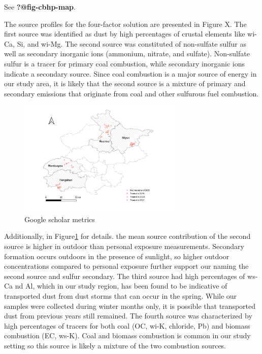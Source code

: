 \documentclass[
  letterpaper,
  DIV=11,
  numbers=noendperiod]{scrartcl}
\begin{document}
See \textbf{?@fig-cbhp-map}.

\newpage

The source profiles for the four-factor solution are presented in Figure
X. The first source was identified as dust by high percentages of
crustal elements like wi-Ca, Si, and wi-Mg. The second source was
constituted of non-sulfate sulfur as well as secondary inorganic ions
(ammonium, nitrate, and sulfate). Non-sulfate sulfur is a tracer for
primary coal combustion, while secondary inorganic ions indicate a
secondary source. Since coal combustion is a major source of energy in
our study area, it is likely that the second source is a mixture of
primary and secondary emissions that originate from coal and other
sulfurous fuel combustion.

\begin{figure}
\includegraphics[width=0.7\textwidth]{images/policy-implementation-map.png}
\caption{\label{fig-map}{Google scholar metrics}}
\end{figure}

Additionally, in Figure\ref{fig-map} for details. the mean source
contribution of the second source is higher in outdoor than personal
exposure measurements. Secondary formation occurs outdoors in the
presence of sunlight, so higher outdoor concentrations compared to
personal exposure further support our naming the second source and
sulfur secondary. The third source had high percentages of ws-Ca nd Al,
which in our study region, has been found to be indicative of
transported dust from dust storms that can occur in the spring. While
our samples were collected during winter months only, it is possible
that transported dust from previous years still remained. The fourth
source was characterized by high percentages of tracers for both coal
(OC, wi-K, chloride, Pb) and biomass combustion (EC, ws-K). Coal and
biomass combustion is common in our study setting so this source is
likely a mixture of the two combustion sources.
\end{document}
